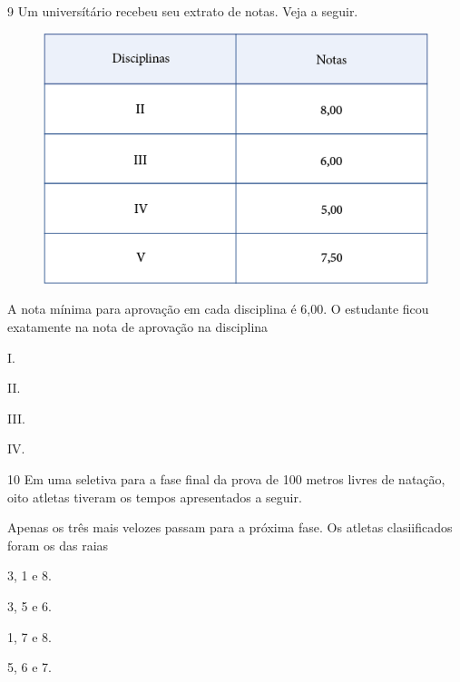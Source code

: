 \num{9} Um universítário recebeu seu extrato de notas. Veja a seguir.

\begin{figure}[htpb!]
\centering
\includegraphics[width=\textwidth]{media/image85.png}
\end{figure}

A nota mínima para aprovação em cada disciplina é 6,00. O estudante ficou exatamente na nota de aprovação na disciplina

\begin{escolha}
\item
  I.
\item
  II.
\item
  III.
\item
  IV.
\end{escolha}


\num{10} Em uma seletiva para a fase final da prova de 100 metros livres de
natação, oito atletas tiveram os tempos apresentados a seguir.


Apenas os três mais velozes passam para a próxima fase. Os atletas clasiificados foram os das raias

\begin{escolha}
\item
  3, 1 e 8.
\item
  3, 5 e 6.
\item
  1, 7 e 8.
\item
  5, 6 e 7.
\end{escolha}


